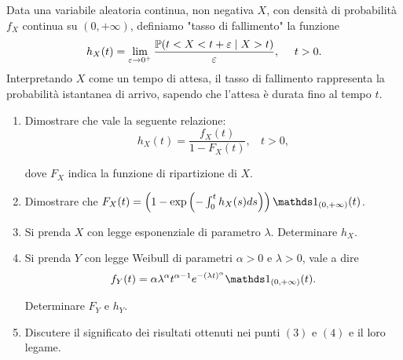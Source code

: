 Data una variabile aleatoria continua, non negativa $X$, con densità di probabilità $f_{X}$ continua su $\left( 0,+\infty \right)$, definiamo "tasso di fallimento" la funzione
\begin{equation*}
h_{X}( t) =\lim _{\varepsilon \rightarrow 0^{+}}\frac{\mathbb{P}( t< X< t+\varepsilon \mid X >t)}{\varepsilon } ,\ \ \ \ t >0.
\end{equation*}
Interpretando $X$ come un tempo di attesa, il tasso di fallimento rappresenta la probabilità istantanea di arrivo, sapendo che l'attesa è durata fino al tempo $t$.
\begin{enumerate}
\item Dimostrare che vale la seguente relazione:\begin{equation*}
h_{X}( t) =\frac{f_{X}( t)}{1-F_{X}( t)} ,\ \ \ \ t >0,
\end{equation*}

dove $F_{X}$ indica la funzione di ripartizione di $X$.
\item Dimostrare che $F_{X}( t) =\left( 1-\exp\left( -\int _{0}^{t} h_{X}( s) ds\right)\right) \Ind_{( 0,+\infty )}( t)$.
\item Si prenda $X$ con legge esponenziale di parametro $\lambda $. Determinare $h_{X}$.
\item Si prenda $Y$ con legge Weibull di parametri $\alpha  >0$ e $\lambda  >0$, vale a dire\begin{equation*}
f_{Y}( t) =\alpha \lambda ^{\alpha } t^{\alpha -1} e^{-( \lambda t)^{\alpha }} \Ind_{( 0,+\infty )}( t) .
\end{equation*}

Determinare $F_{Y}$ e $h_{Y}$.
\item Discutere il significato dei risultati ottenuti nei punti $( 3)$ e $( 4)$ e il loro legame.
\end{enumerate}
\Esercizio{}

